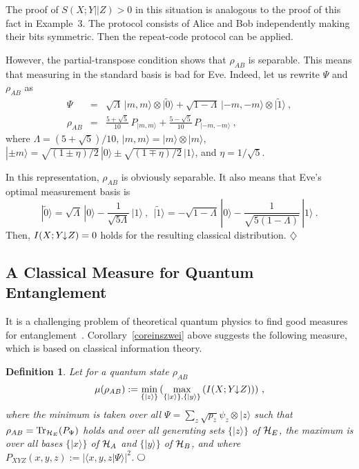 \documentclass{article}
\newtheorem{defi}{Definition}
\newcommand{\textcirc}{%
  \setlength{\unitlength}{1.5ex}%
  \begin{picture}(1.1,1)(-.55,-.55)%
    \put(0,0){\circle{1.1}}%
  \end{picture}}
\newcommand{\defend}{\hspace*{\fill} $\textcirc$}
\newcommand{\exend}{\hspace*{\fill} $\diamondsuit$}
\newcommand{\Tr}{{\rm Tr}}
\newcommand{\HA}{{\cal H}_{{A}}}
\newcommand{\HB}{{\cal H}_{{B}}}
\newcommand{\HE}{{\cal H}_{{E}}}
\newcommand{\ida}{I(X;Y\hspace{-1.3mm}\downarrow\hspace{-0.8mm} Z)}
\begin{document}
The proof of $S(X;Y||Z)>0$ in this situation is analogous to the proof of this 
fact in Example~3. The protocol consists of Alice and Bob independently 
making their bits symmetric. Then the repeat-code protocol can be 
applied. 

However, the 
partial-transpose condition shows that $\rho_{AB}$ is separable. This 
means that measuring in the standard basis is bad for Eve. Indeed,
let us rewrite $\Psi$ and $\rho_{AB}$ as
\begin{eqnarray*}
\Psi &  = &   \sqrt{\Lambda}\, |m,m\rangle \otimes|\tilde 0\rangle + 
     \sqrt{1-\Lambda}\, |-m,-m\rangle \otimes|\tilde 1\rangle\ ,\\
\rho_{AB} &   =&   \frac{5+\sqrt{5}}{10}\,  P_{|m,m\rangle } + 
         \frac{5-\sqrt{5}}{10}\,  P_{|-m,-m\rangle }\ ,
\end{eqnarray*}
where
$\Lambda  =  (5+\sqrt{5})/10$, 
$|m,m\rangle  =  |m\rangle \otimes|m\rangle$,
$|\pm m\rangle  =  \sqrt{(1\pm\eta)/2}\, |0\rangle  \pm \sqrt{(1\mp\eta)/2}\, |1\rangle$, and 
$\eta  =  1/\sqrt{5}$.

In this representation, $\rho_{AB}$ is obviously separable. It also means that 
 Eve's optimal measurement basis is
\[
|\tilde 0\rangle =\sqrt{\Lambda}\, |0\rangle  - \frac{1}{\sqrt{5\Lambda}}\, |1\rangle \ ,\ \ 
|\tilde 1\rangle =-\sqrt{1-\Lambda}\, |0\rangle  - \frac{1}{\sqrt{5(1-\Lambda)}}\, |1\rangle\ . 
\]
Then, $\ida=0$ holds for the resulting classical distribution.
\exend
\ \\



  \subsection{A Classical Measure for Quantum Entanglement}
\label{linkingmeasure}

It is a
challenging problem
of theoretical quantum physics to find good measures for entanglement~\cite{qp9610044}.
Corollary~\ref{coreinszwei} above
   suggests the following measure,  which is based on
    classical information theory. 
\begin{defi}
{\rm
Let for a quantum state $\rho_{AB}$
\[
\mu(\rho_{AB}):= \min_{\{|z\rangle\}}\, (\max_{\{|x\rangle\},\{|y\rangle\}}\, (\ida))\ ,
\]
where the minimum is taken over all $\Psi=\sum_z\sqrt{p_z}\psi_z\otimes|z\rangle $
such that
$\rho_{AB}=\Tr_{\HE}(P_{\Psi})$ holds
and over all generating sets 
 $\{|z\rangle\}$ of $\HE$, the maximum is over all bases $\{|x\rangle\}$
of $\HA$ and $\{|y\rangle\}$
of $\HB$, and where
$P_{XYZ}(x,y,z):=|\langle x,y,z|\Psi\rangle |^2$.
}
\defend
\end{defi}
\end{document}
